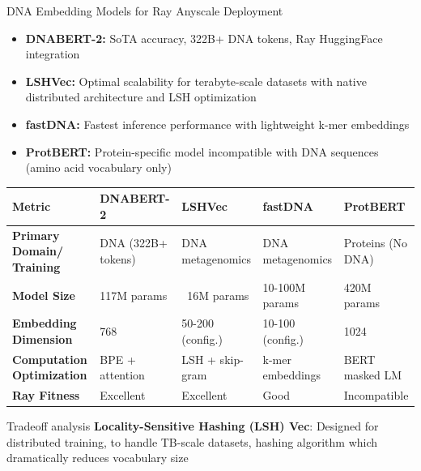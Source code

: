 \documentclass[aspectratio=169]{beamer}
\begin{document}
\begin{frame}{DNA Embedding Models for Ray Anyscale Deployment}

\begin{itemize}
    \item \textbf{DNABERT-2:} SoTA accuracy, 322B+ DNA tokens, Ray HuggingFace integration
    \item \textbf{LSHVec:} Optimal scalability for terabyte-scale datasets with native distributed architecture and LSH optimization
    \item \textbf{fastDNA:} Fastest inference performance with lightweight k-mer embeddings
    \item \textbf{ProtBERT:} Protein-specific model incompatible with DNA sequences (amino acid vocabulary only)
\end{itemize}

\vfill

\begin{table}[b]
\centering
\tiny
\begin{tabular}{|p{2.2cm}|p{2.0cm}|p{2.0cm}|p{2.0cm}|p{2.0cm}|}
\hline
\textbf{Metric} & \textbf{DNABERT-2} & \textbf{LSHVec} & \textbf{fastDNA} & \textbf{ProtBERT} \\
\hline
\textbf{Primary Domain/ Training} & DNA (322B+ tokens) & DNA metagenomics & DNA metagenomics & Proteins (No DNA) \\
\hline
\textbf{Model Size} & 117M params & ~16M params & 10-100M params & 420M params \\
\hline
\textbf{Embedding Dimension} & 768 & 50-200 (config.) & 10-100 (config.) & 1024 \\
\hline
\textbf{Computation Optimization} & BPE + attention & LSH + skip-gram & k-mer embeddings & BERT masked LM \\
\hline
\textbf{Ray Fitness} & Excellent & Excellent & Good & Incompatible \\
\hline
\end{tabular}
\end{table}

    \vspace{0.3cm}
    \begin{block}{Tradeoff analysis}
        \textbf{Locality-Sensitive Hashing (LSH) Vec}: Designed for distributed training, to handle TB-scale datasets, hashing algorithm which dramatically reduces vocabulary size
    \end{block}

\end{frame}
\end{document}
